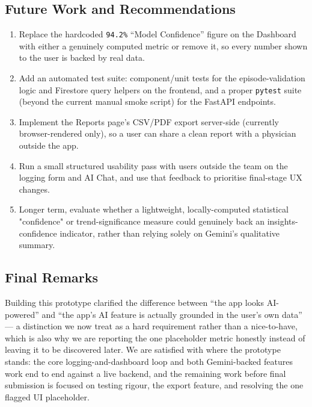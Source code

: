 \documentclass[11pt,a4paper]{article}
\begin{document}
\subsection{Future Work and Recommendations}
\begin{enumerate}
    \item Replace the hardcoded \texttt{94.2\%} ``Model Confidence'' figure on the Dashboard
    with either a genuinely computed metric or remove it, so every number shown to the user is
    backed by real data.
    \item Add an automated test suite: component/unit tests for the episode-validation logic
    and Firestore query helpers on the frontend, and a proper \texttt{pytest} suite (beyond the
    current manual smoke script) for the FastAPI endpoints.
    \item Implement the Reports page's CSV/PDF export server-side (currently browser-rendered
    only), so a user can share a clean report with a physician outside the app.
    \item Run a small structured usability pass with users outside the team on the logging
    form and AI Chat, and use that feedback to prioritise final-stage UX changes.
    \item Longer term, evaluate whether a lightweight, locally-computed statistical
    "confidence" or trend-significance measure could genuinely back an insights-confidence
    indicator, rather than relying solely on Gemini's qualitative summary.
\end{enumerate}

\subsection{Final Remarks}
Building this prototype clarified the difference between ``the app looks AI-powered'' and ``the
app's AI feature is actually grounded in the user's own data'' — a distinction we now treat as
a hard requirement rather than a nice-to-have, which is also why we are reporting the one
placeholder metric honestly instead of leaving it to be discovered later. We are satisfied with
where the prototype stands: the core logging-and-dashboard loop and both Gemini-backed features
work end to end against a live backend, and the remaining work before final submission is
focused on testing rigour, the export feature, and resolving the one flagged UI placeholder.
\end{document}
